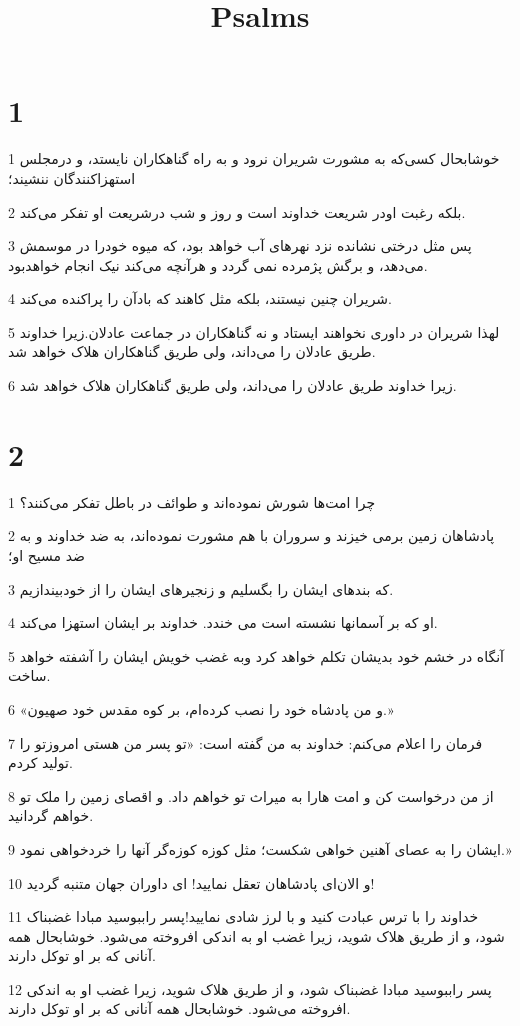 

\title{Psalms}

 
\chapter{1}

\par 1 خوشابحال کسی‌که به مشورت شریران نرود و به راه گناهکاران نایستد، و درمجلس استهزاکنندگان ننشیند؛
\par 2 بلکه رغبت اودر شریعت خداوند است و روز و شب درشریعت او تفکر می‌کند.
\par 3 پس مثل درختی نشانده نزد نهرهای آب خواهد بود، که میوه خودرا در موسمش می‌دهد، و برگش پژمرده نمی گردد و هر‌آنچه می‌کند نیک انجام خواهدبود.
\par 4 شریران چنین نیستند، بلکه مثل کاهند که بادآن را پراکنده می‌کند.
\par 5 لهذا شریران در داوری نخواهند ایستاد و نه گناهکاران در جماعت عادلان.زیرا خداوند طریق عادلان را می‌داند، ولی طریق گناهکاران هلاک خواهد شد.
\par 6 زیرا خداوند طریق عادلان را می‌داند، ولی طریق گناهکاران هلاک خواهد شد.
 
\chapter{2}

\par 1 چرا امت‌ها شورش نموده‌اند و طوائف در باطل تفکر می‌کنند؟
\par 2 پادشاهان زمین برمی خیزند و سروران با هم مشورت نموده‌اند، به ضد خداوند و به ضد مسیح او؛
\par 3 که بندهای ایشان را بگسلیم و زنجیرهای ایشان را از خودبیندازیم.
\par 4 او که بر آسمانها نشسته است می خندد. خداوند بر ایشان استهزا می‌کند.
\par 5 آنگاه در خشم خود بدیشان تکلم خواهد کرد وبه غضب خویش ایشان را آشفته خواهد ساخت.
\par 6 «و من پادشاه خود را نصب کرده‌ام، بر کوه مقدس خود صهیون.»
\par 7 فرمان را اعلام می‌کنم: خداوند به من گفته است: «تو پسر من هستی امروزتو را تولید کردم.
\par 8 از من درخواست کن و امت هارا به میراث تو خواهم داد. و اقصای زمین را ملک تو خواهم گردانید.
\par 9 ایشان را به عصای آهنین خواهی شکست؛ مثل کوزه کوزه‌گر آنها را خردخواهی نمود.»
\par 10 و الان‌ای پادشاهان تعقل نمایید! ای داوران جهان متنبه گردید!
\par 11 خداوند را با ترس عبادت کنید و با لرز شادی نمایید!پسر راببوسید مبادا غضبناک شود، و از طریق هلاک شوید، زیرا غضب او به اندکی افروخته می‌شود. خوشابحال همه آنانی که بر او توکل دارند.
\par 12 پسر راببوسید مبادا غضبناک شود، و از طریق هلاک شوید، زیرا غضب او به اندکی افروخته می‌شود. خوشابحال همه آنانی که بر او توکل دارند.
 
